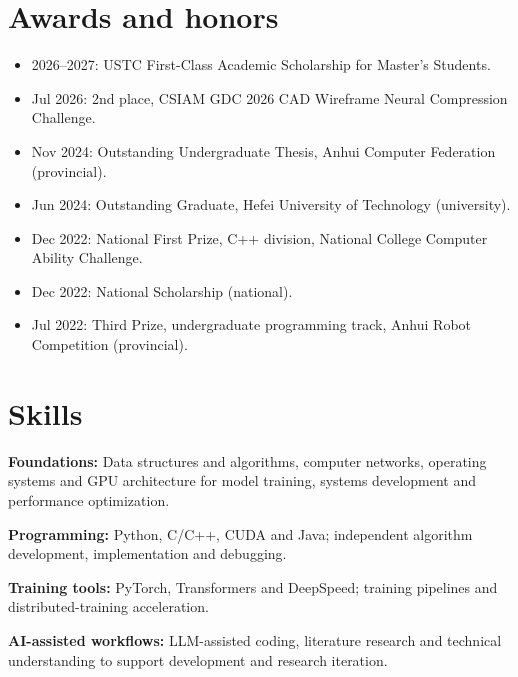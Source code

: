 \documentclass[11pt,a4paper]{article}
\begin{document}
\section{Awards and honors}
\begin{itemize}
\item 2026--2027: USTC First-Class Academic Scholarship for Master's Students.
\item Jul 2026: 2nd place, CSIAM GDC 2026 CAD Wireframe Neural Compression Challenge.
\item Nov 2024: Outstanding Undergraduate Thesis, Anhui Computer Federation (provincial).
\item Jun 2024: Outstanding Graduate, Hefei University of Technology (university).
\item Dec 2022: National First Prize, C++ division, National College Computer Ability Challenge.
\item Dec 2022: National Scholarship (national).
\item Jul 2022: Third Prize, undergraduate programming track, Anhui Robot Competition (provincial).
\end{itemize}

\section{Skills}
\textbf{Foundations:} Data structures and algorithms, computer networks, operating systems and GPU architecture for model training, systems development and performance optimization.

\textbf{Programming:} Python, C/C++, CUDA and Java; independent algorithm development, implementation and debugging.

\textbf{Training tools:} PyTorch, Transformers and DeepSpeed; training pipelines and distributed-training acceleration.

\textbf{AI-assisted workflows:} LLM-assisted coding, literature research and technical understanding to support development and research iteration.
\end{document}
